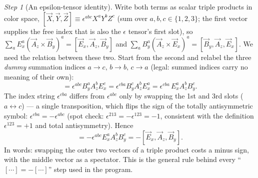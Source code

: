 \documentclass[11pt,a4paper]{article}
\numberwithin{equation}{section}
\theoremstyle{remark}
\newtheorem{step}{Step}[subsection]
\begin{document}
\begin{step}[An epsilon-tensor identity]
Write both terms as scalar triple products in color space,
$[\vec X,\vec Y,\vec Z]\equiv\epsilon^{abc}X^aY^bZ^c$ (sum over
$a,b,c\in\{1,2,3\}$; the first vector supplies the free index that is also
the $\epsilon$ tensor's first slot), so
$\sum_aE_x^a(\vec A_z\times\vec B_y)^a=[\vec E_x,\vec A_z,\vec B_y]$ and
$\sum_aB_y^a(\vec A_z\times\vec E_x)^a=[\vec B_y,\vec A_z,\vec E_x]$. We need
the relation between these two. Start from the second and relabel the three
\emph{dummy} summation indices $a\to c,\,b\to b,\,c\to a$ (legal: summed
indices carry no meaning of their own):
\begin{equation}
[\vec B_y,\vec A_z,\vec E_x]=\epsilon^{abc}B_y^aA_z^bE_x^c
=\epsilon^{cba}B_y^cA_z^bE_x^a
=\epsilon^{cba}\,E_x^aA_z^bB_y^c .
\end{equation}
The index string $\epsilon^{cba}$ differs from $\epsilon^{abc}$ only by
swapping the 1st and 3rd slots ($a\leftrightarrow c$) --- a single
transposition, which flips the sign of the totally antisymmetric symbol:
$\epsilon^{cba}=-\epsilon^{abc}$ (spot check: $\epsilon^{213}=-\epsilon^{123}
=-1$, consistent with the definition $\epsilon^{123}=+1$ and total
antisymmetry). Hence
\begin{equation}
[\vec B_y,\vec A_z,\vec E_x]=-\epsilon^{abc}E_x^aA_z^bB_y^c
=-[\vec E_x,\vec A_z,\vec B_y].
\label{eq:tripleflip}
\end{equation}
In words: swapping the outer two vectors of a triple product costs a minus
sign, with the middle vector as a spectator. This is the general rule
behind every ``$[\cdots]=-[\cdots]$'' step used in the program.
\end{step}
\end{document}
